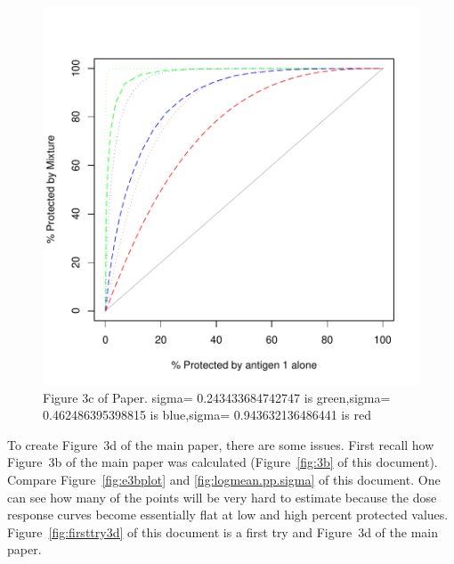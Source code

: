 \documentclass{article}[12pt]
\begin{document}
\begin{figure}
\caption{Figure 3c of Paper.
sigma= 0.243433684742747  is  green,sigma= 0.462486395398815  is  blue,sigma= 0.943632136486441  is  red
 \label{fig:3c} }
\includegraphics{hbimdetails-fig3c}
\end{figure}

To create Figure~3d of the main paper, there are some issues. First recall how Figure~3b of the main paper was calculated 
(Figure~\ref{fig:3b} of this document). Compare Figure~\ref{fig:e3bplot} and \ref{fig:logmean.pp.sigma} of this document. 
One can see how many of the points will be very hard to estimate because the dose response curves become essentially flat
at low and high percent protected values. 
Figure~\ref{fig:firsttry3d} of this document is a first try and Figure~3d of the main paper.  
\end{document}
